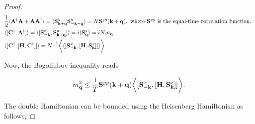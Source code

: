 \documentclass{homework}
\begin{document}
\begin{proof}
\begin{equation}
    \begin{split}
        &\frac{1}{2}\langle {\bf A}^\dagger {\bf A} + {\bf A} {\bf A}^\dagger \rangle = \langle {\bf S}_{{\bf k+q}}^y {\bf S}_{{\bf -k-q}}^y \rangle = N {\bf S}^{yy}({\bf k + q}), \textnormal{ where ${\bf S}^{yy}$ is the equal-time correlation function. } \\
       & \langle [{\bf C}^\dagger, {\bf A}^\dagger] \rangle = \langle [ {\bf S}^x_{-{\bf k}}, {\bf S}_{{\bf k+q}}^y] \rangle = i \langle {\bf S}_{{\bf q}}^z \rangle = iN m_{{\bf q}} \\
       & \langle [{\bf C}^\dagger, [{\bf H}, {\bf C}^\dagger]] \rangle = N^{-1} \bigg \langle \langle [{\bf S}^x_{-{\bf k}}, [{\bf H}, {\bf S}^x_{{\bf k}}]] \rangle \bigg \rangle.
    \end{split}
\end{equation}

Now, the Bogoliubov inequality reads 

\begin{equation}
    m_{{\bf q}}^2 \leq \frac{1}{T} {\bf S}^{yy}({\bf k + q}) \bigg \langle [{\bf S}^x_{-{\bf k}}, [{\bf H}, {\bf S}^x_{{\bf k}}]] \bigg \rangle.
\end{equation}

The double Hamiltonian can be bounded using the Heisenberg Hamiltonian as follows, 


\end{proof}
\end{document}
